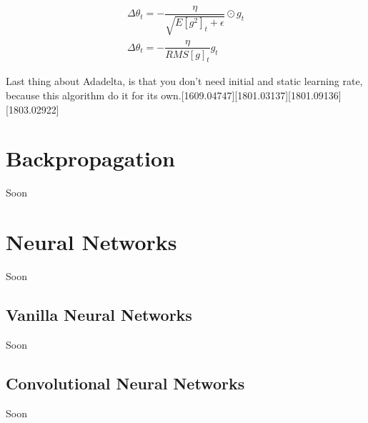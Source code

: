 \begin{equation}
	\begin{split}
			\Delta\theta_t = - \dfrac{\eta}{\sqrt{E[g^2]_t + \epsilon}} \odot g_t \\
			\Delta\theta_t = - \dfrac{\eta}{RMS[g]_t} g_t
	\end{split}
\end{equation}

\noindent Last thing about Adadelta, is that you don't need initial and static learning rate, because this algorithm do it for its own.[1609.04747][1801.03137][1801.09136][1803.02922]

\section{Backpropagation}\label{sec:3.7}
\vspace{-0.5cm}
\noindent Soon

\vspace{-0.3cm}




\section{Neural Networks}\label{sec:3.8}
\vspace{-0.5cm}
\noindent Soon

\vspace{-0.3cm}


\subsection{Vanilla Neural Networks}\label{sec:3.8.1}
\vspace{-0.5cm}
\noindent Soon


\vspace{-0.3cm}


\subsection{Convolutional Neural Networks}\label{sec:3.8.2}
\vspace{-0.5cm}
\noindent Soon



